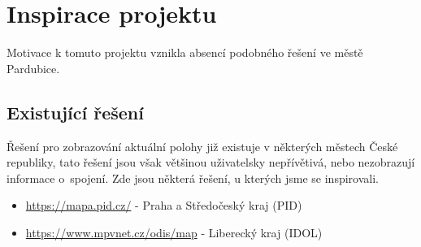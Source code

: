\section{Inspirace projektu}
Motivace k tomuto projektu vznikla absencí podobného řešení ve městě Pardubice.
\subsection{Existující řešení}
Řešení pro zobrazování aktuální polohy již existuje v některých městech České republiky, tato řešení jsou však většinou uživatelsky nepřívětivá, nebo nezobrazují informace o~spojení. Zde jsou některá řešení, u kterých jsme se inspirovali.

\begin{itemize}
    \item \url{https://mapa.pid.cz/} - Praha a Středočeský kraj (PID)
    \item \url{https://www.mpvnet.cz/odis/map} - Liberecký kraj (IDOL)
\end{itemize}